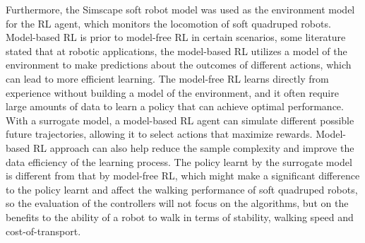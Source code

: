  Furthermore, the Simscape soft robot model was used as the environment model for the \ac{RL} agent\cite{jiSynthesizingOptimalGait2022}, which monitors the locomotion of soft quadruped robots. Model-based \ac{RL} is prior to model-free \ac{RL} in certain scenarios, some literature\cite{polydorosSurveyModelBasedReinforcement2017,wangBenchmarkingModelBasedReinforcement2019} stated that at robotic applications, the model-based \ac{RL} utilizes a model of the environment to make predictions about the outcomes of different actions, which can lead to more efficient learning. The model-free \ac{RL} learns directly from experience without building a model of the environment\cite{arulkumaranDeepReinforcementLearning2017}, and it often require large amounts of data to learn a policy that can achieve optimal performance\cite{calisirModelFreeReinforcementLearning2019}. With a surrogate model, a model-based \ac{RL} agent can simulate different possible future trajectories, allowing it to select actions that maximize rewards\cite{fazeliSeeFeelAct2019}. Model-based \ac{RL} approach can also help reduce the sample complexity and improve the data efficiency of the learning process\cite{atkesonComparisonDirectModelbased1997}. The policy learnt by the surrogate model is different from that by model-free \ac{RL}\cite{fazeliSeeFeelAct2019}, which might make a significant difference to the policy learnt and affect the walking performance of soft quadruped robots, so the evaluation of the controllers will not focus on the algorithms, but on the benefits to the ability of a robot to walk in terms of stability, walking speed and cost-of-transport. 

